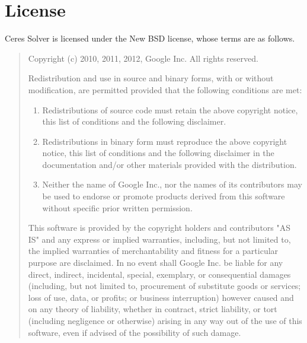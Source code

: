 \chapter{License}
Ceres Solver is licensed under the New BSD license, whose terms are as follows.

\begin{quotation}

\noindent
Copyright (c) 2010, 2011, 2012, Google Inc. All rights reserved.

\noindent
Redistribution and use in source and binary forms, with or without
modification, are permitted provided that the following conditions are met:
\begin{enumerate}
\item Redistributions of source code must retain the above copyright notice,
      this list of conditions and the following disclaimer.
\item Redistributions in binary form must reproduce the above copyright notice,
      this list of conditions and the following disclaimer in the documentation
      and/or other materials provided with the distribution.
\item Neither the name of Google Inc.,  nor the names of its contributors may
      be used to endorse or promote products derived from this software without
      specific prior written permission.
\end{enumerate}

\noindent
This software is provided by the copyright holders and contributors "AS IS" and
any express or implied warranties, including, but not limited to, the implied
warranties of merchantability and fitness for a particular purpose are
disclaimed. In no event shall Google Inc. be liable for any direct, indirect,
incidental, special, exemplary, or consequential damages (including, but not
limited to, procurement of substitute goods or services; loss of use, data, or
profits; or business interruption) however caused and on any theory of
liability, whether in contract, strict liability, or tort (including negligence
or otherwise) arising in any way out of the use of this software, even if
advised of the possibility of such damage.
\end{quotation}

